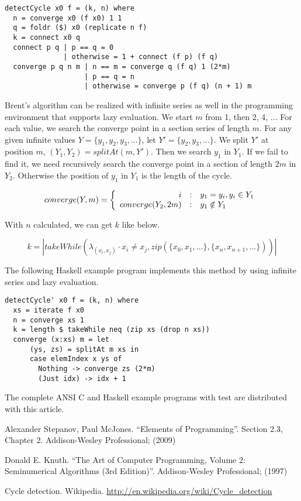 \documentclass{article}
\begin{document}
\lstset{language=Haskell}
\begin{lstlisting}
detectCycle x0 f = (k, n) where
  n = converge x0 (f x0) 1 1
  q = foldr ($) x0 (replicate n f)
  k = connect x0 q
  connect p q | p == q = 0
              | otherwise = 1 + connect (f p) (f q)
  converge p q n m | n == m = converge q (f q) 1 (2*m)
                   | p == q = n
                   | otherwise = converge p (f q) (n + 1) m
\end{lstlisting}

Brent's algorithm can be realized with infinite series as well in the programming environment that supports
lazy evaluation. We start $m$ from 1, then 2, 4, ... For each value, we search the converge point in
a section series of length $m$. For any given infinite values $Y = \{y_1, y_2, y_3, ...\}$, let
$Y' = \{y_2, y_3, ...\}$. We split $Y'$ at position $m$,
$(Y_1, Y_2) = splitAt(m, Y')$. Then we search $y_1$ in $Y_1$. If we fail to find it, we need
recursively search the converge point in a section of length $2m$ in $Y_2$. Otherwise the
position of $y_1$ in $Y_1$ is the length of the cycle.

\begin{equation}
converge(Y, m) = \left \{
  \begin{array}
  {r@{\quad:\quad}l}
  i & y_1 = y_i, y_i \in Y_1 \\
  converge(Y_2, 2m) & y_1 \notin Y_1
  \end{array}
\right.
\end{equation}

With $n$ calculated, we can get $k$ like below.

\begin{equation}
k = |takeWhile(\lambda_{(x_i, x_j)} \cdot x_i \neq x_j, zip(\{x_0, x_1, ... \}, \{x_{n}, x_{n+1}, ...\}))|
\end{equation}

The following Haskell example program implements this method by using infinite series and lazy evaluation.

\lstset{language=Haskell}
\begin{lstlisting}
detectCycle' x0 f = (k, n) where
  xs = iterate f x0
  n = converge xs 1
  k = length $ takeWhile neq (zip xs (drop n xs))
  converge (x:xs) m = let
      (ys, zs) = splitAt m xs in
      case elemIndex x ys of
        Nothing -> converge zs (2*m)
        (Just idx) -> idx + 1
\end{lstlisting}

The complete ANSI C and Haskell example programs with test are distributed with this article.

\begin{thebibliography}{99}

Alexander Stepanov, Paul McJones. ``Elements of Programming''. Section 2.3, Chapter 2. Addison-Wesley Professional; (2009)

Donald E. Knuth. ``The Art of Computer Programming, Volume 2: Seminumerical Algorithms (3rd Edition)''. Addison-Wesley Professional; (1997)

Cycle detection. Wikipedia. \url{http://en.wikipedia.org/wiki/Cycle_detection}

\end{thebibliography}
\end{document}
